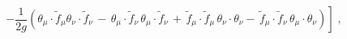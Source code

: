 \begin{equation}
\left. - \frac{1}{2 g} ( \theta_\mu\cdot{\tilde f}_\mu  
\theta_\nu\cdot{\tilde f}_\nu  \,-\,
\theta_\mu\cdot{\tilde f}_\nu \,  \theta_\mu\cdot{\tilde f}_\nu \,
+\, {\tilde f}_\mu\cdot{\tilde f}_\mu \,  \theta_\nu\cdot \theta_\nu
  -\, {\tilde f}_\mu\cdot{\tilde f}_\nu  \,  \theta_\mu \cdot
  \theta_\nu )
\right] \;,
\end{equation}

